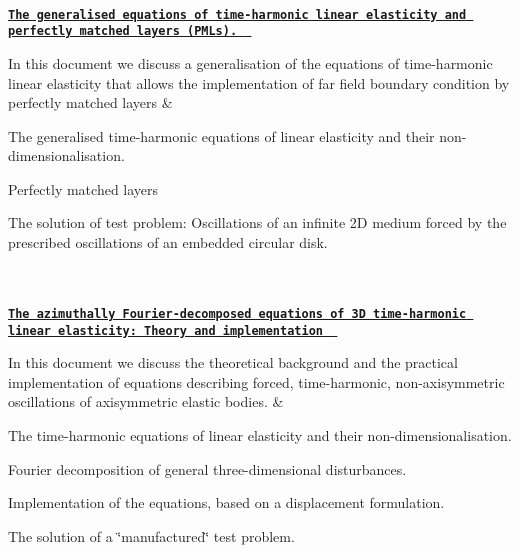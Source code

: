 \begin{longtabu}
{}\\
\href{../../generalised_time_harmonic_linear_elasticity/html/index.html}{\tt {\bfseries The generalised equations of time-\/harmonic linear elasticity and perfectly matched layers (P\+M\+Ls). } }

In this document we discuss a generalisation of the equations of time-\/harmonic linear elasticity that allows the implementation of far field boundary condition by perfectly matched layers  &
\begin{DoxyItemize}
\item The generalised time-\/harmonic equations of linear elasticity and their non-\/dimensionalisation.
\item Perfectly matched layers
\item The solution of test problem\+: Oscillations of an infinite 2D medium forced by the prescribed oscillations of an embedded circular disk.
\end{DoxyItemize}



\\
\\
\href{../../time_harmonic_fourier_decomposed_linear_elasticity/cylinder/html/index.html}{\tt {\bfseries The azimuthally Fourier-\/decomposed equations of 3D time-\/harmonic linear elasticity\+: Theory and implementation } }

In this document we discuss the theoretical background and the practical implementation of equations describing forced, time-\/harmonic, non-\/axisymmetric oscillations of axisymmetric elastic bodies.  &
\begin{DoxyItemize}
\item The time-\/harmonic equations of linear elasticity and their non-\/dimensionalisation.
\item Fourier decomposition of general three-\/dimensional disturbances.
\item Implementation of the equations, based on a displacement formulation.
\item The solution of a \char`\"{}manufactured\char`\"{} test problem.
\end{DoxyItemize}


\end{longtabu}
